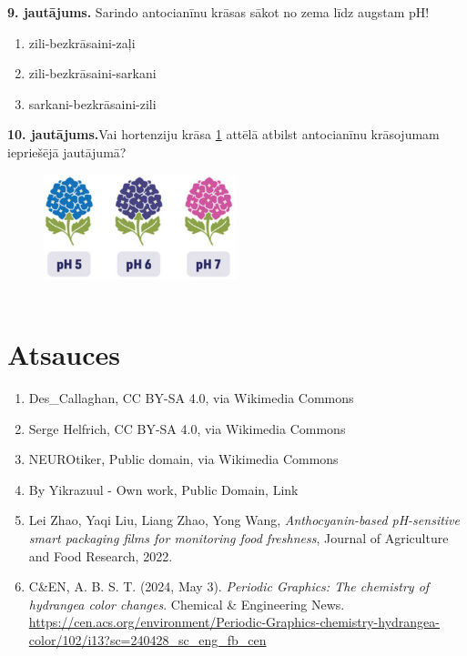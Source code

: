 \documentclass[12pt,a4paper]{article}
\begin{document}
\noindent \textbf{9. jautājums.} Sarindo antocianīnu krāsas sākot no zema līdz augstam pH!

\begin{enumerate}[label=\Alph*.]
    \item zili-bezkrāsaini-zaļi
    \item zili-bezkrāsaini-sarkani
    \item sarkani-bezkrāsaini-zili 

\end{enumerate}

\noindent \textbf{10. jautājums.}Vai hortenziju krāsa \ref{fig:hortenzijas} attēlā atbilst antocianīnu krāsojumam iepriešējā jautājumā?

\begin{figure}[H]
    \centering
    \includegraphics[width=0.5\textwidth]{atteli/hydrangea.png}
    \caption{~}
    \label{fig:hortenzijas}
\end{figure}



\section*{Atsauces}
\sloppy
\begin{enumerate}[leftmargin=*]
    \item Des\_Callaghan, CC BY-SA 4.0, via Wikimedia Commons
    \item Serge Helfrich, CC BY-SA 4.0, via Wikimedia Commons
    \item NEUROtiker, Public domain, via Wikimedia Commons
    \item By Yikrazuul - Own work, Public Domain, Link
    \item Lei Zhao, Yaqi Liu, Liang Zhao, Yong Wang, \textit{Anthocyanin-based pH-sensitive smart packaging films for monitoring food freshness}, Journal of Agriculture and Food Research, 2022.
    \item C\&EN, A. B. S. T. (2024, May 3). \textit{Periodic Graphics: The chemistry of hydrangea color changes}. Chemical \& Engineering News. \url{https://cen.acs.org/environment/Periodic-Graphics-chemistry-hydrangea-color/102/i13?sc=240428_sc_eng_fb_cen}

\end{enumerate}
\end{document}
